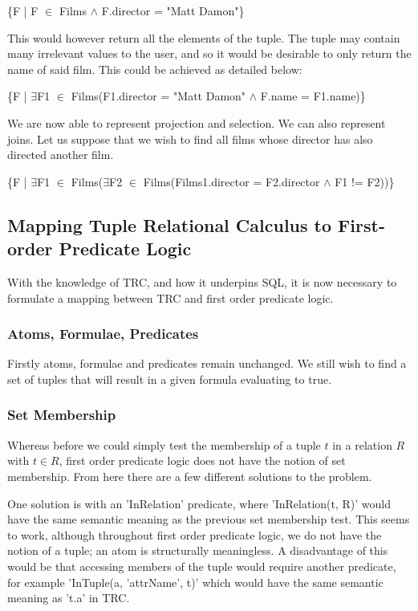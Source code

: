 \documentclass[a4paper, 11pt]{article}
\begin{document}
      \{F | F $\in$ Films $\land$ F.director = "Matt Damon"\}

      This would however return all the elements of the tuple. The tuple may
      contain many irrelevant values to the user, and so it would be desirable
      to only return the name of said film. This could be achieved as detailed
      below:

      \{F | $\exists$F1 $\in$ Films(F1.director = "Matt Damon" $\land$ F.name =
      F1.name)\}

      We are now able to represent projection and selection. We can also
      represent joins. Let us suppose that we wish to find all films whose
      director has also directed another film.

      \{F | $\exists$F1 $\in$ Films($\exists$F2 $\in$ Films(Films1.director =
      F2.director $\land$ F1 != F2))\}

  \subsection{Mapping Tuple Relational Calculus to First-order Predicate Logic}
    With the knowledge of TRC, and how it underpins SQL, it is now necessary to
    formulate a mapping between TRC and first order predicate logic.

    \subsubsection{Atoms, Formulae, Predicates}
      Firstly atoms, formulae and predicates remain unchanged. We still wish to
      find a set of tuples that will result in a given formula evaluating to
      true.

    \subsubsection{Set Membership}
      Whereas before we could simply test the membership of a tuple $t$ in a
      relation $R$ with $t \in R$, first order predicate logic does not have
      the notion of set membership. From here there are a few different
      solutions to the problem.

      One solution is with an 'InRelation' predicate, where 'InRelation(t, R)'
      would have the same semantic meaning as the previous set membership test.
      This seems to work, although throughout first order predicate logic, we
      do not have the notion of a tuple; an atom is structurally meaningless. A
      disadvantage of this would be that accessing members of the tuple would
      require another predicate, for example 'InTuple(a, 'attrName', t)' which
      would have the same semantic meaning as 't.a' in TRC.
\end{document}
